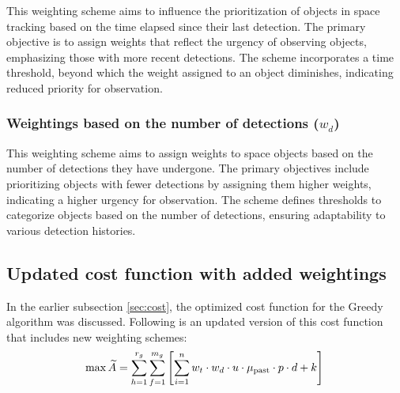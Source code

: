 This weighting scheme aims to influence the prioritization of objects in space tracking based on the time elapsed since their last detection. The primary objective is to assign weights that reflect the urgency of observing objects, emphasizing those with more recent detections. The scheme incorporates a time threshold, beyond which the weight assigned to an object diminishes, indicating reduced priority for observation.\\

\subsubsection{Weightings based on the number of detections ($w_d$)}
This weighting scheme aims to assign weights to space objects based on the number of detections they have undergone. The primary objectives include prioritizing objects with fewer detections by assigning them higher weights, indicating a higher urgency for observation. The scheme defines thresholds to categorize objects based on the number of detections, ensuring adaptability to various detection histories.\\


\subsection{Updated cost function with added weightings}
In the earlier subsection \ref{sec:cost}, the optimized cost function for the Greedy algorithm was discussed. Following is an updated version of this cost function that includes new weighting schemes:\\

\begin{equation}
	\max\widetilde{A} = \sum_{h=1}^{r_g} \sum_{f=1}^{m_g} \left[ \sum_{i=1}^{n} w_t \cdot w_d \cdot u \cdot \mu_{\text{past}} \cdot p \cdot d + k \right] \quad	\\
\end{equation}